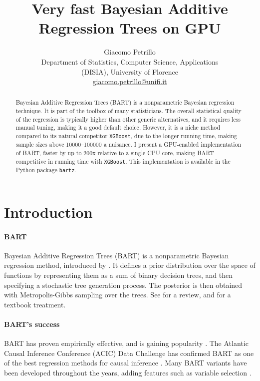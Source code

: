 \documentclass{article}
\title{Very fast Bayesian Additive Regression Trees on GPU}
\author{Giacomo Petrillo\\Department of Statistics, Computer Science,
Applications\\(DISIA), University of Florence\\
\href{mailto:giacomo.petrillo@unifi.it}{giacomo.petrillo@unifi.it}}
\begin{document}
    \maketitle

    \begin{abstract}
        
        Bayesian Additive Regression Trees (BART) is a nonparametric Bayesian regression technique. It is part of the toolbox of many statisticians. The overall statistical quality of the regression is typically higher than other generic alternatives, and it requires less manual tuning, making it a good default choice. However, it is a niche method compared to its natural competitor \texttt{XGBoost}, due to the longer running time, making sample sizes above \num{10000}--\num{100000} a nuisance. I present a GPU-enabled implementation of BART, faster by up to 200x relative to a single CPU core, making BART competitive in running time with \texttt{XGBoost}. This implementation is available in the Python package \texttt{bartz}.

    \end{abstract}

    \section{Introduction}
    \label{sec:intro}

    \paragraph{BART}

    Bayesian Additive Regression Trees (BART) is a nonparametric Bayesian regression method, introduced by \textcite{chipman2006,chipman2010}. It defines a prior distribution over the space of functions by representing them as a sum of binary decision trees, and then specifying a stochastic tree generation process. The posterior is then obtained with Metropolis-Gibbs sampling over the trees. See \textcite{hill2020} for a review, and \textcite[ch.~5]{daniels2023} for a textbook treatment.

    \paragraph{BART's success}
    
    BART has proven empirically effective, and is gaining popularity \autocite[consider, e.g.,][]{tan2019}. The Atlantic Causal Inference Conference (ACIC) Data Challenge has confirmed BART as one of the best regression methods for causal inference \autocite{dorie2019,hahn2019,acic2019,thal2023}. Many BART variants have been developed throughout the years, adding features such as variable selection \autocite{linero2018}.
\end{document}
